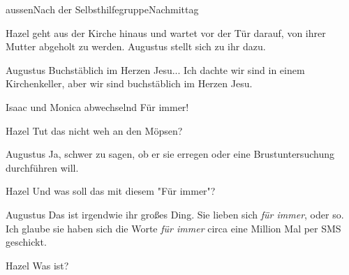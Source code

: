 \documentclass[12pt]{article}
\begin{document}
    \begin{scene}[cut to]{aussen}{Nach der Selbsthilfegruppe}{Nachmittag}
        \begin{scenedescription}
            \gls{Hazel} geht aus der Kirche hinaus und wartet vor der Tür darauf, von ihrer Mutter abgeholt zu werden.
            \gls{Augustus} stellt sich zu ihr dazu.
        \end{scenedescription}

        \begin{dialog}{Augustus}
            Buchstäblich im Herzen Jesu...
            Ich dachte wir sind in einem Kirchenkeller, aber wir sind buchstäblich im Herzen Jesu.
        \end{dialog}


        \begin{dialog}{Isaac und Monica abwechselnd}
            Für immer!
        \end{dialog}

        \begin{dialog}{Hazel}
            Tut das nicht weh an den Möpsen?
        \end{dialog}

        \begin{dialog}{Augustus}
            Ja, schwer zu sagen, ob er sie erregen oder eine Brustuntersuchung durchführen will.
        \end{dialog}

        \begin{dialog}{Hazel}
            Und was soll das mit diesem "Für immer"?
        \end{dialog}

        \begin{dialog}{Augustus}
            Das ist irgendwie ihr großes Ding.
            Sie lieben sich \emph{für immer}, oder so.
            Ich glaube sie haben sich die Worte \emph{für immer} circa eine Million Mal per SMS geschickt.
        \end{dialog}


        \begin{dialog}{Hazel}
            Was ist?
        \end{dialog}


\end{scene}
\end{document}
